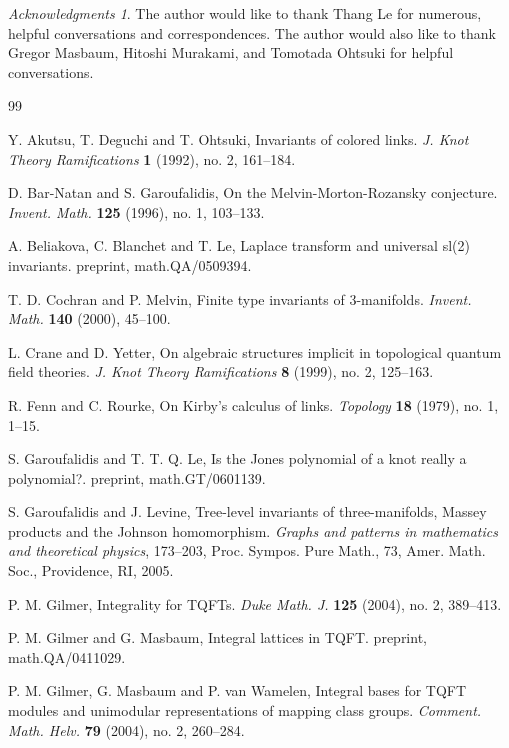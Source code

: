 \documentclass{amsart}
\numberwithin{equation}{section}
\numberwithin{figure}{section}
\theoremstyle{plain}
\theoremstyle{definition}
\theoremstyle{remark}
\newtheorem*{acknowledgments}{Acknowledgments}
\begin{document}
\begin{acknowledgments}
  The author would like to thank Thang Le for numerous, helpful
  conversations and correspondences.  The author would also like to
  thank Gregor Masbaum, Hitoshi Murakami, and Tomotada Ohtsuki for
  helpful conversations.
\end{acknowledgments}

\begin{thebibliography}{99}

Y. Akutsu, T. Deguchi and T. Ohtsuki,
Invariants of colored links.
{\it J. Knot Theory Ramifications} {\bf 1} (1992), no. 2, 161--184.

D. Bar-Natan and S. Garoufalidis,
On the Melvin-Morton-Rozansky conjecture.
{\it Invent. Math.} {\bf 125} (1996),  no. 1, 103--133.

A. Beliakova, C. Blanchet and T. Le,
Laplace transform and universal sl(2) invariants.
preprint, math.QA/0509394.

T. D. Cochran and P. Melvin,
Finite type invariants of 3-manifolds.
{\it Invent. Math.} {\bf 140} (2000), 45--100.

L. Crane and D. Yetter,
On algebraic structures implicit in topological quantum field theories.
{\it J. Knot Theory Ramifications} {\bf 8} (1999), no. 2, 125--163.

R. Fenn and C. Rourke,
On Kirby's calculus of links.
{\it Topology} {\bf 18}  (1979), no. 1, 1--15.

S. Garoufalidis and T. T. Q. Le,
Is the Jones polynomial of a knot really a polynomial?.
preprint, math.GT/0601139.

S. Garoufalidis and J. Levine,
Tree-level invariants of three-manifolds, Massey products and the Johnson homomorphism.
{\it Graphs and patterns in mathematics and theoretical physics},  173--203, Proc. Sympos. Pure Math., 73, Amer. Math. Soc., Providence, RI, 2005.

P. M. Gilmer,
Integrality for TQFTs.
{\it Duke Math. J.} {\bf 125} (2004), no. 2, 389--413.

  P. M. Gilmer and G. Masbaum,
  Integral lattices in TQFT. preprint, math.QA/0411029.

  P. M. Gilmer, G. Masbaum and P. van Wamelen,
  Integral bases for TQFT modules and unimodular representations of mapping class groups.  {\it Comment. Math. Helv.}
{\bf 79} (2004), no. 2, 260--284.


\end{thebibliography}
\end{document}
